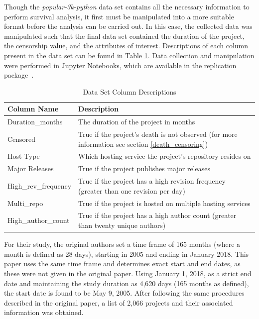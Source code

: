 \documentclass[sigconf,review]{acmart}
\begin{document}
Though the \emph{popular-3k-python} data set contains all the necessary information to perform survival analysis, it first must be manipulated into a more suitable format before the analysis can be carried out. 
In this case, the collected data was manipulated such that the final data set contained the duration of the project, the censorship value, and the attributes of interest. 
Descriptions of each column present in the data set can be found in Table \ref{tab:data}. 
Data collection and manipulation were performed in Jupyter Notebooks, which are available in the replication package~\cite{repl-package}.

\begin{table}
    \caption{Data Set Column Descriptions}
    \label{tab:data}
    \begin{tabular}{ll}
        \toprule
        Column Name & Description \\
        \midrule
        Duration\_months     & The duration of the project in months \\
        Censored             & True if the project's death is not observed (for more information see section \ref{death_censoring}) \\
        Host Type            & Which hosting service the project's repository resides on \\
        Major Releases       & True if the project publishes major releases \\
        High\_rev\_frequency & True if the project has a high revision frequency (greater than one revision per day) \\
        Multi\_repo          & True if the project is hosted on multiple hosting services\\
        High\_author\_count  & True if the project has a high author count (greater than twenty unique authors) \\
        \bottomrule
    \end{tabular}
\end{table}

For their study, the original authors set a time frame of 165 months (where a month is defined as 28 days), starting in 2005 and ending in January 2018.
This paper uses the same time frame and determines exact start and end dates, as these were not given in the original paper.
Using January 1, 2018, as a strict end date and maintaining the study duration as 4,620 days (165 months as defined), the start date is found to be May 9, 2005.
After following the same procedures described in the original paper, a list of 2,066 projects and their associated information was obtained.
\end{document}
